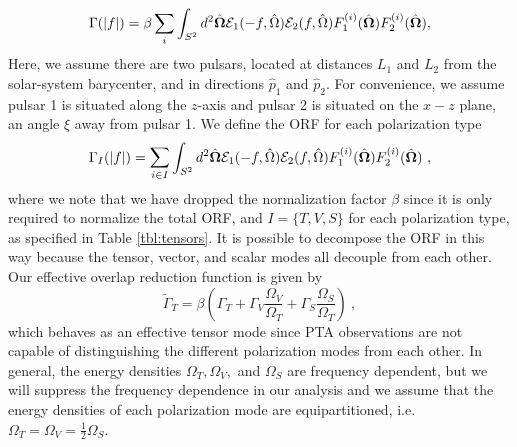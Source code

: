 \documentclass[prd,aps,psfig,nofootinbib,nobibnotes,superscriptaddress,preprintnumbers,times]{revtex4-2}\setlength{\topmargin}{-14mm}
\begin{document}
\begin{equation}\label{eq:orf_full}
    \Gamma(|f|) = \beta \sum_i \int_{S^2} d^2 \hat{\bf{\Omega}} \mathcal{E}_1(-f, \hat{\Omega}) \mathcal{E}_2(f, \hat{\Omega}) F_1^{(i)}(\hat{\bf{\Omega}}) F_2^{(i)}(\hat{\bf{\Omega}}),
\end{equation}
Here, we assume there are two pulsars, located at distances $L_1$ and $L_2$ from the solar-system barycenter, and in directions $\hat{p}_1$ and $\hat{p}_2$. For convenience, we assume pulsar 1 is situated along the $z$-axis and pulsar 2 is situated on the $x-z$ plane, an angle $\xi$ away from pulsar 1. We define the ORF for each polarization type
\begin{equation}\label{eq:orf_type}
    \Gamma_I(|f|) = \mathlarger{\sum}_{i \in I} \int_{S^2} d^2 \hat{\bf{\Omega}} \mathcal{E}_1(-f, \hat{\Omega}) \mathcal{E}_2(f, \hat{\Omega}) F_1^{(i)}(\hat{\bf{\Omega}}) F_2^{(i)}(\hat{\bf{\Omega}}) \ ,
\end{equation}
where we note that we have dropped the normalization factor $\beta$ since it is only required to normalize the total ORF, and $I = \{T,V,S\}$ for each polarization type, as specified in Table \ref{tbl:tensors}. It is possible to decompose the ORF in this way because the tensor, vector, and scalar modes all decouple from each other. Our effective overlap reduction function is given by 
\begin{equation}\label{eq:eff_orf}
    \tilde{\Gamma}_{T} = \beta \left(\Gamma_{T} + \Gamma_{V} \frac{\Omega_V}{\Omega_T} + \Gamma_{S} \frac{\Omega_S}{\Omega_T} \right) \ ,
\end{equation}
which behaves as an effective tensor mode since PTA observations are not capable of distinguishing the different polarization modes from each other. In general, the energy densities $\Omega_T, \Omega_V,$ and $\Omega_S$ are frequency dependent, but we will suppress the frequency dependence in our analysis and we assume that the energy densities of each polarization mode are equipartitioned, i.e.\ $\Omega_T = \Omega_V = \frac{1}{2}\Omega_S$. 
\end{document}
